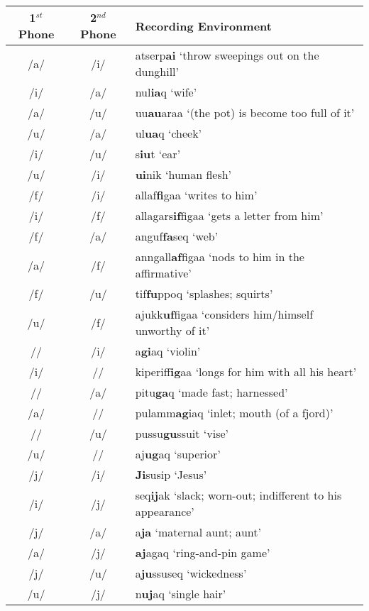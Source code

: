 \documentclass[12pt]{article}
\begin{document}
	\begin{centering}
	\begin{tabular}{|c|c|l|}
	\hline
	1$^{st}$ Phone & 2$^{nd}$ Phone & Recording Environment \\
	\hline
	/a/ & /i/ & atserp\textbf{ai} `throw sweepings out on the dunghill' \\
	/i/ & /a/ & nul\textbf{ia}q `wife' \\
	/a/ & /u/ & uu\textbf{au}araa `(the pot) is become too full of it' \\
	/u/ & /a/ & ul\textbf{ua}q `cheek' \\
	/i/ & /u/ & s\textbf{iu}t `ear' \\
	/u/ & /i/ & \textbf{ui}nik `human flesh' \\
	/f/ & /i/ & allaf\textbf{fi}gaa `writes to him' \\
	/i/ & /f/ & allagars\textbf{if}figaa `gets a letter from him'\\
	/f/ & /a/ & anguf\textbf{fa}seq `web' \\
	/a/ & /f/ & anngall\textbf{af}figaa `nods to him in the affirmative' \\
	/f/ & /u/ & tif\textbf{fu}ppoq `splashes; squirts'\\
	/u/ & /f/ & ajukk\textbf{uf}figaa `considers him/himself unworthy of it'\\
	/\textipa{G}/ & /i/ & a\textbf{gi}aq `violin'\\
	/i/ & /\textipa{G}/ & kiperiff\textbf{ig}aa `longs for him with all his heart'\\
	/\textipa{G}/ & /a/ & pitu\textbf{ga}q `made fast; harnessed'\\
	/a/ & /\textipa{G}/ & pulamm\textbf{ag}iaq `inlet; mouth (of a fjord)'\\
	/\textipa{G}/ & /u/ & pussu\textbf{gu}ssuit `vise'\\ 
	/u/ & /\textipa{G}/ & aj\textbf{ug}aq `superior' \\
	/j/ & /i/ & \textbf{Ji}susip `Jesus'\\
	/i/ & /j/ & seq\textbf{ij}ak `slack; worn-out; indifferent to his appearance' \\
	/j/ & /a/ & a\textbf{ja} `maternal aunt; aunt' \\
	/a/ & /j/ & \textbf{aj}agaq `ring-and-pin game'\\
	/j/ & /u/ & a\textbf{ju}ssuseq `wickedness' \\
	/u/ & /j/ & n\textbf{uj}aq `single hair' \\
	\hline
	\end{tabular}
	\end{centering}
\end{document}
